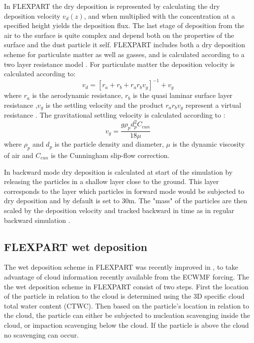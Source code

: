 In FLEXPART the dry deposition is represented by calculating the dry deposition velocity $v_d(z)$, and when multiplied with the concentration at a specified height yields the deposition flux. The last stage of deposition from the air to the surface is quite complex and depend both on the properties of the surface and the dust particle it self. 
FLEXPART includes both a dry deposition scheme for particulate matter as well as gasses, and is calculated according to a two layer resistance model \parencite{Flexpart-2005_ref_paper}. For particulate matter the deposition velocity is calculated according to:
\begin{equation}
    v_d=[r_a + r_b + r_a r_b v_g]^{-1} + v_g
\end{equation}
where $r_a$ is the aerodynamic resistance, $r_b$ is the quasi laminar surface layer resistance ,$v_g$ is the settling velocity and the product $r_a r_b v_g$ represent a virtual resistance \parencite{GIARDINA201811_drydepo}. The gravitational settling velocity is calculated according to \textcite{slinn1982predictions}:
\begin{equation}
    v_g = \frac{g\rho_p d_p^2 C_{cun}}{18\mu}
\end{equation}
where $\rho_p$ and $d_p$ is the particle density and diameter, $\mu$ is the dynamic viscosity of air and $C_{cun}$ is the Cunningham slip-flow correction.

In backward mode dry deposition is calculated at start of the simulation by releasing the particles in a shallow layer close to the ground. This layer corresponds to the layer which particles in forward mode would be subjected to dry deposition and by default is set to 30m. The "mass" of the particles are then scaled by the deposition velocity and tracked backward in time as in regular backward simulation \parencite{eckhardt2017source}. 

\subsection{FLEXPART wet deposition}

The wet deposition scheme in FLEXPART was recently improved in \textcite{flexpart_wetdep}, to take advantage of cloud information recently available from the ECWMF forcing. The the wet deposition scheme in FLEXPART consist of two steps. First the location of the particle in relation to the cloud is determined using the 3D specific cloud total
water content (CTWC).  Then based on the particle's location in relation to the cloud, the particle can either be subjected to nucleation scavenging inside the cloud, or impaction scavenging below the cloud. If the particle is above the cloud no scavenging can occur. 

